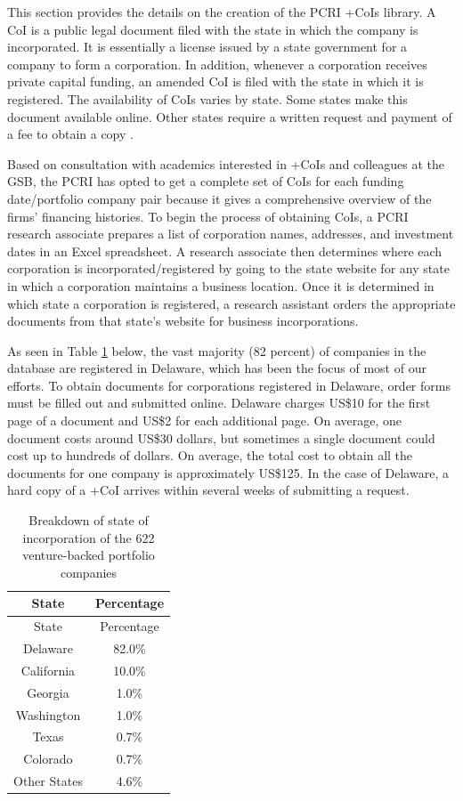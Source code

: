 \documentclass[
]{WileySix}
\begin{document}
This section provides the details on the creation of the PCRI +CoIs\textbar{} library. A CoI is a public legal document filed with the state in which the company is incorporated. It is essentially a license issued by a state government for a company to form a corporation. In addition, whenever a corporation receives private capital funding, an amended CoI is filed with the state in which it is registered. The availability of CoIs varies by state. Some states make this document available online. Other states require a written request and payment of a fee to obtain a copy \citep{masters2020}.

Based on consultation with academics interested in +CoIs\textbar{} and colleagues at the GSB, the PCRI has opted to get a complete set of CoIs for each funding date/portfolio company pair because it gives a comprehensive overview of the firms' financing histories. To begin the process of obtaining CoIs, a PCRI research associate prepares a list of corporation names, addresses, and investment dates in an Excel spreadsheet. A research associate then determines where each corporation is incorporated/registered by going to the state website for any state in which a corporation maintains a business location. Once it is determined in which state a corporation is registered, a research assistant orders the appropriate documents from that state's website for business incorporations.

As seen in Table \ref{tab:pcritable2} below, the vast majority (82 percent) of companies in the database are registered in Delaware, which has been the focus of most of our efforts. To obtain documents for corporations registered in Delaware, order forms must be filled out and submitted online. Delaware charges US\$10 for the first page of a document and US\$2 for each additional page. On average, one document costs around US\$30 dollars, but sometimes a single document could cost up to hundreds of dollars. On average, the total cost to obtain all the documents for one company is approximately US\$125. In the case of Delaware, a hard copy of a +CoI\textbar{} arrives within several weeks of submitting a request.

\begin{longtable}[]{@{}cc@{}}
\caption{\label{tab:pcritable2} Breakdown of state of incorporation of the 622 venture-backed portfolio companies}\tabularnewline
\toprule
State & Percentage\tabularnewline
\midrule
\endfirsthead
\toprule
State & Percentage\tabularnewline
\midrule
\endhead
Delaware & 82.0\%\tabularnewline
California & 10.0\%\tabularnewline
Georgia & 1.0\%\tabularnewline
Washington & 1.0\%\tabularnewline
Texas & 0.7\%\tabularnewline
Colorado & 0.7\%\tabularnewline
Other States & 4.6\%\tabularnewline
\bottomrule
\end{longtable}
\end{document}
